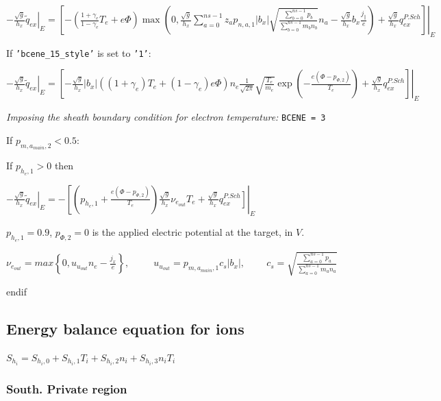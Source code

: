 \documentclass[a4paper,10pt]{report}
\begin{document}
$\left. -\frac{\sqrt g}{h_x} \widetilde q_{ex} \right|_E = \left. \left[
	-\left(
		\frac{1 + \gamma_e}{1 -\gamma_e} T_e + e\Phi
	\right)
	\max \left(
		0, \frac{\sqrt g}{h_x}
                \sum \limits_{a=0}^{ns-1} z_a p_{n,a,1} |b_x|
		\sqrt{\frac{\sum \limits_{b=0}^{ns-1} p_b}{\sum \limits_{b=0}^{ns-1} m_b n_b}} n_a
		-
		\frac{\sqrt g}{h_x} b_x \frac{j_{\parallel}}e
	\right)
	+
	\frac{\sqrt g}{h_x} q_{ex}^{P.Sch}
\right] \right|_E$

If {\tt 'bcene\_15\_style'} is set to {\tt '1'}:

$\left. -\frac{\sqrt g}{h_x} \widetilde q_{ex} \right|_E = \left. \left[
	-\frac{\sqrt g}{h_x} |b_x| \left(
		\left( 1 + \gamma_e \right) T_e +
		\left( 1 - \gamma_e \right) e \Phi
	\right) n_e \frac{1}{\sqrt{2 \pi}}
	\sqrt{\frac{T_e}{m_e}} \exp \left( -\frac{e \left( \Phi - p_{\Phi,2} \right) }{T_e} \right)
	+
	\frac{\sqrt g}{h_x} q_{ex}^{P.Sch}
\right] \right|_E$

{\em Imposing the sheath boundary condition for electron temperature:} {\tt BCENE = 3}

If $p_{m,a_{main},2} < 0.5$:

If $p_{h_e,1} > 0$ then

$\left. -\frac{\sqrt g}{h_x} \widetilde q_{ex} \right|_E = -\left[ \left(
	p_{h_e,1} + \frac{e \left( \Phi - p_{\Phi,2} \right) }{T_e}
\right)
\frac{\sqrt g}{h_x} \nu_{e_{out}} T_e
+ \left.
\frac{\sqrt g}{h_x} q_{ex}^{P.Sch}
\right] \right|_E$

$p_{h_e,1} = 0.9$, $p_{\Phi,2} = 0$ is the applied electric potential at the target, in $V$.

$\nu_{e_{out}} = max \left\{
	0,u_{u_{out}} n_e - \frac{j_x}e
\right\}
,\;\;\;\;\;\;\;\;\;
u_{u_{out}} = p_{m,a_{main},1} c_s |b_x|
,\;\;\;\;\;\;\;\;
c_s = \sqrt{\frac{\sum \limits_{a=0}^{ns-1} p_a}{\sum \limits_{a=0}^{ns-1} m_a n_a}}$

endif


\subsection{Energy balance equation for ions}

$S_{h_i} = S_{h_i,0} + S_{h_i,1} T_i + S_{h_i,2} n_i + S_{h_i,3} n_i T_i$

\subsubsection{South. Private region}
\end{document}
